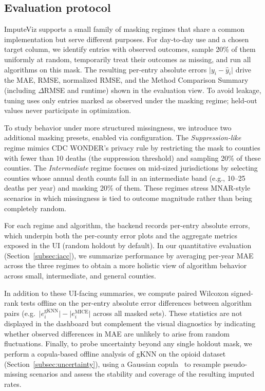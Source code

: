 \documentclass[review]{vgtc}
\begin{document}
\subsection{Evaluation protocol}
\label{subsec:eval_protocol}
ImputeViz supports a small family of masking regimes that share a common implementation but serve different purposes. For day-to-day use and a chosen target column, we identify entries with observed outcomes, sample 20\% of them uniformly at random, temporarily treat their outcomes as missing, and run all algorithms on this mask. The resulting per-entry absolute errors $\lvert y_i - \hat{y}_i \rvert$ drive the MAE, RMSE, normalized RMSE, and the Method Comparison Summary (including $\Delta$RMSE and runtime) shown in the evaluation view. To avoid leakage, tuning uses only entries marked as observed under the masking regime; held-out values never participate in optimization.

To study behavior under more structured missingness, we introduce two additional masking presets, enabled via configuration. The \emph{Suppression-like} regime mimics CDC WONDER's privacy rule by restricting the mask to counties with fewer than 10 deaths (the suppression threshold) and sampling 20\% of these counties. The \emph{Intermediate} regime focuses on mid-sized jurisdictions by selecting counties whose annual death counts fall in an intermediate band (e.g., 10--25 deaths per year) and masking 20\% of them. These regimes stress MNAR-style scenarios in which missingness is tied to outcome magnitude rather than being completely random.

For each regime and algorithm, the backend records per-entry absolute errors, which underpin both the per-county error plots and the aggregate metrics exposed in the UI (random holdout by default). In our quantitative evaluation (Section~\ref{subsec:iacc}), we summarize performance by averaging per-year MAE across the three regimes to obtain a more holistic view of algorithm behavior across small, intermediate, and general counties.

In addition to these UI-facing summaries, we compute paired Wilcoxon signed-rank tests offline on the per-entry absolute error differences between algorithm pairs (e.g.\ $\lvert e_i^{\text{gKNN}}\rvert - \lvert e_i^{\text{MICE}}\rvert$ across all masked sets). These statistics are not displayed in the dashboard but complement the visual diagnostics by indicating whether observed differences in MAE are unlikely to arise from random fluctuations. Finally, to probe uncertainty beyond any single holdout mask, we perform a copula-based offline analysis of gKNN on the opioid dataset (Section~\ref{subsec:uncertainty}), using a Gaussian copula~\cite{nelsen2006introduction,joe2014dependence,hollenbach2021multiple} to resample pseudo-missing scenarios and assess the stability and coverage of the resulting imputed rates.
\end{document}
